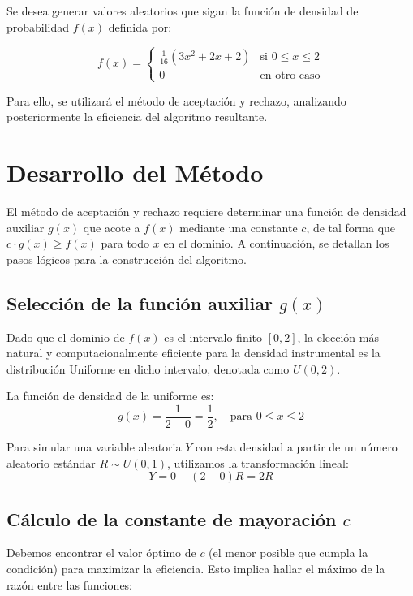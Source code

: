 \documentclass[12pt, a4paper]{article}
\begin{document}
	Se desea generar valores aleatorios que sigan la función de densidad de probabilidad $f(x)$ definida por:
	
	\begin{equation}
		f(x) = 
		\begin{cases} 
			\frac{1}{16} (3x^2 + 2x + 2) & \text{si } 0 \leq x \leq 2 \\
			0 & \text{en otro caso}
		\end{cases}
	\end{equation}
	
	Para ello, se utilizará el método de aceptación y rechazo, analizando posteriormente la eficiencia del algoritmo resultante.
	
	\section{Desarrollo del Método}
	
	El método de aceptación y rechazo requiere determinar una función de densidad auxiliar $g(x)$ que acote a $f(x)$ mediante una constante $c$, de tal forma que $c \cdot g(x) \geq f(x)$ para todo $x$ en el dominio. A continuación, se detallan los pasos lógicos para la construcción del algoritmo.
	
	\subsection{Selección de la función auxiliar $g(x)$}
	
	Dado que el dominio de $f(x)$ es el intervalo finito $[0, 2]$, la elección más natural y computacionalmente eficiente para la densidad instrumental es la distribución Uniforme en dicho intervalo, denotada como $U(0, 2)$.
	
	La función de densidad de la uniforme es:
	\begin{equation}
		g(x) = \frac{1}{2-0} = \frac{1}{2}, \quad \text{para } 0 \leq x \leq 2
	\end{equation}
	
	Para simular una variable aleatoria $Y$ con esta densidad a partir de un número aleatorio estándar $R \sim U(0,1)$, utilizamos la transformación lineal:
	\[ Y = 0 + (2-0)R = 2R \]
	
	\subsection{Cálculo de la constante de mayoración $c$}
	
	Debemos encontrar el valor óptimo de $c$ (el menor posible que cumpla la condición) para maximizar la eficiencia. Esto implica hallar el máximo de la razón entre las funciones:
	
\end{document}
